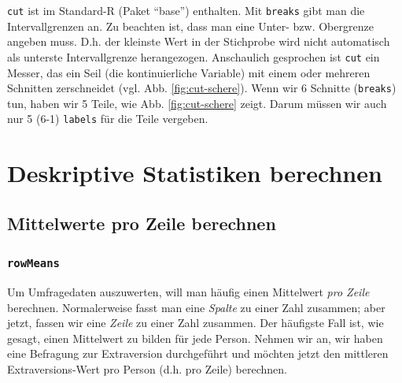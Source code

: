 \documentclass[12pt,ngerman,]{book}
\makeatletter
\newenvironment{Shaded}{\begin{snugshade}}{\end{snugshade}}
\newcommand{\KeywordTok}[1]{\textcolor[rgb]{0.13,0.29,0.53}{\textbf{{#1}}}}
\newcommand{\StringTok}[1]{\textcolor[rgb]{0.31,0.60,0.02}{{#1}}}
\newcommand{\CommentTok}[1]{\textcolor[rgb]{0.56,0.35,0.01}{\textit{{#1}}}}
\newcommand{\NormalTok}[1]{{#1}}
\newenvironment{kframe}{%
\medskip{}
\setlength{\fboxsep}{.8em}
 \def\at@end@of@kframe{}%
 \ifinner\ifhmode%
  \def\at@end@of@kframe{\end{minipage}}%
  \begin{minipage}{\columnwidth}%
 \fi\fi%
 \def\FrameCommand##1{\hskip\@totalleftmargin \hskip-\fboxsep
 \colorbox{shadecolor}{##1}\hskip-\fboxsep
     \hskip-\linewidth \hskip-\@totalleftmargin \hskip\columnwidth}%
 \MakeFramed {\advance\hsize-\width
   \@totalleftmargin\z@ \linewidth\hsize
   \@setminipage}}%
 {\par\unskip\endMakeFramed%
 \at@end@of@kframe}
\renewenvironment{Shaded}{\begin{kframe}}{\end{kframe}}
\makeatother
\begin{document}
\texttt{cut} ist im Standard-R (Paket ``base'') enthalten. Mit
\texttt{breaks} gibt man die Intervallgrenzen an. Zu beachten ist, dass
man eine Unter- bzw. Obergrenze angeben muss. D.h. der kleinste Wert in
der Stichprobe wird nicht automatisch als unterste Intervallgrenze
herangezogen. Anschaulich gesprochen ist \texttt{cut} ein Messer, das
ein Seil (die kontinuierliche Variable) mit einem oder mehreren
Schnitten zerschneidet (vgl. Abb. \ref{fig:cut-schere}). Wenn wir 6
Schnitte (\texttt{breaks}) tun, haben wir 5 Teile, wie Abb.
\ref{fig:cut-schere} zeigt. Darum müssen wir auch nur 5 (6-1)
\texttt{labels} für die Teile vergeben.

\section{Deskriptive Statistiken
berechnen}\label{deskriptive-statistiken-berechnen}

\subsection{Mittelwerte pro Zeile
berechnen}\label{mittelwerte-pro-zeile-berechnen}

\subsubsection{\texorpdfstring{\texttt{rowMeans}}{rowMeans}}\label{rowmeans}

Um Umfragedaten auszuwerten, will man häufig einen Mittelwert \emph{pro
Zeile} berechnen. Normalerweise fasst man eine \emph{Spalte} zu einer
Zahl zusammen; aber jetzt, fassen wir eine \emph{Zeile} zu einer Zahl
zusammen. Der häufigste Fall ist, wie gesagt, einen Mittelwert zu bilden
für jede Person. Nehmen wir an, wir haben eine Befragung zur
Extraversion durchgeführt und möchten jetzt den mittleren
Extraversions-Wert pro Person (d.h. pro Zeile) berechnen.

\begin{Shaded}
\end{Shaded}
\end{document}
